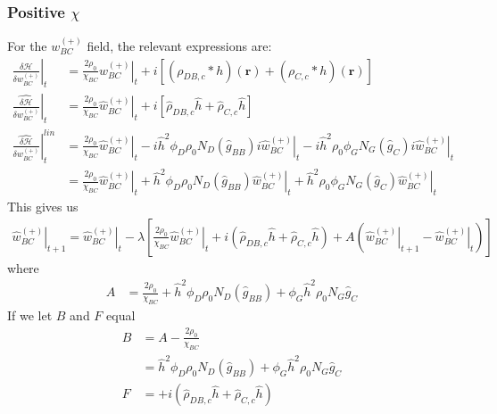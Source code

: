 \documentclass{article}
\begin{document}
    \subsubsection{Positive $\chi$}
  For the $w_{BC}^{(+)}$ field, the relevant expressions are:
  \begin{align*}
    \left. \frac{\delta \mathcal{H}}{\delta  w_{BC}^{(+)} } \right|_t &=
      \frac{2\rho_0}{\chi_{BC}} \left. w_{BC}^{(+)} \right|_t
      + i [ (\rho_{DB,c} \ast h)(\mathbf{r})
            + (\rho_{C,c} \ast h)(\mathbf{r}) ] \\
      \left. \hat{\frac{\delta \mathcal{H}}{\delta w_{BC}^{(+)}}} \right|_t &=
      \frac{2\rho_0}{\chi_{BC}} \left. \hat{w}_{BC}^{(+)} \right|_t
      + i [ \hat{\rho}_{DB,c} \hat{h}
            + \hat{\rho}_{C,c} \hat{h} ] \\
    \left. \hat{\frac{\delta \mathcal{H}}{\delta w_{BC}^{(+)}}} \right| ^{lin}_t &=
      \frac{2\rho_0}{\chi_{BC}} \left. \hat{w}_{BC}^{(+)} \right|_t
      - i \hat{h}^2 \phi_D \rho_0 N_D
        ( \hat{g}_{BB} ) i \left.
          \hat{w}_{BC}^{(+)} \right|_t - i \hat{h} ^2  {\rho}_0  
          \left. \phi_G N_G (\hat{g}_{C}) i \hat{w}_{BC}^{(+)} \right|_t
          \\
    &= \frac{2\rho_0}{\chi_{BC}} \left. \hat{w}_{BC}^{(+)} \right|_t
      + \hat{h}^2 \phi_D \rho_0 N_D
        ( \hat{g}_{BB})
          \left. \hat{w}_{BC}^{(+)} \right|_t + 
          \hat{h} ^2  {\rho}_0  \left. \phi_G N_G (\hat{g}_{C})  \hat{w}_{BC}^{(+)} \right|_t
  \end{align*}
  This gives us
  \begin{align*}
    \left. \hat{w}_{BC}^{(+)} \right|_{t+1} =
      \left. \hat{w}_{BC}^{(+)} \right|_t - \lambda \left[
        \frac{2\rho_0}{\chi_{BC}} \left. \hat{w}_{BC}^{(+)} \right|_t
        + i ( \hat{\rho}_{DB,c} \hat{h}
              + \hat{\rho}_{C,c} \hat{h} )
        + A ( \left. \hat{w}_{BC}^{(+)} \right|_{t+1}
              - \left. \hat{w}_{BC}^{(+)} \right|_t)
      \right]
  \end{align*}
  where
  \begin{align*}
    A &=
    \frac{2\rho_0}{\chi_{BC}}
        + \hat{h}^2 \phi_D \rho_0 N_D
          ( \hat{g}_{BB}) + \phi_G   \hat{h}^2  \rho_0 N_G 
          \hat{g}_{C}
  \end{align*}
  If we let $B$ and $F$ equal
  \begin{align*}
    B &= A - \frac{2\rho_0}{\chi_{BC}} \\
      &= \hat{h}^2 \phi_D \rho_0 N_D
          ( \hat{g}_{BB}) 
          + \phi_G   \hat{h}^2  \rho_0 N_G 
          \hat{g}_{C}\\
    F &= + i ( \hat{\rho}_{DB,c} \hat{h}
              + \hat{\rho}_{C,c} \hat{h} )
  \end{align*}
\end{document}
